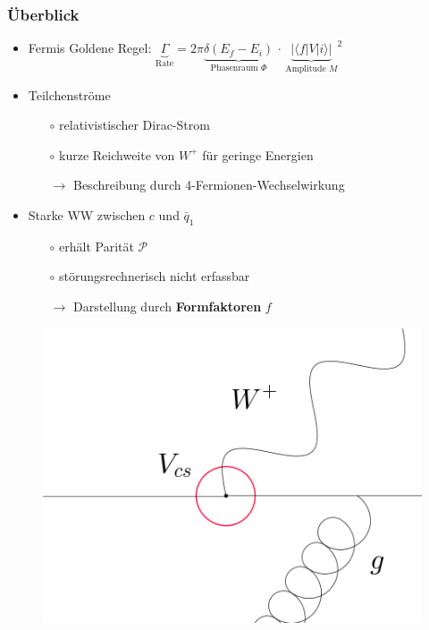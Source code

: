 \documentclass[hyperref={pdfpagelabels=false}]{beamer}
\begin{document}
\begin{frame}
\frametitle{\"Uberblick}
 \begin{minipage}[h]{0.62\textwidth}
 \begin{itemize}
  \item Fermis Goldene Regel: $\underbrace{\Gamma}_{\text{Rate}} = 2\pi \underbrace{\delta(E_f-E_i)}_{\text{Phasenraum }\Phi}\, \cdot \,{\underbrace{|\langle f|V|i\rangle|}_{\text{Amplitude }M}}^2$
  \item Teilchenstr\"ome
  \begin{itemize}
   \item [$\circ$] relativistischer Dirac-Strom
   \item [$\circ$] kurze Reichweite von $W^+$ f\"ur geringe Energien
   \item [$\rightarrow$] Beschreibung durch 4-Fermionen-Wechselwirkung
  \end{itemize}

  \item Starke WW zwischen $c$ und $\bar q_1$
  \begin{itemize}
   \item[$\circ$] erh\"alt Parit\"at $\mathcal{P}$
   \item[$\circ$] st\"orungsrechnerisch nicht erfassbar
   \item[$\rightarrow$] Darstellung durch \textbf{Formfaktoren} $f$
  \end{itemize}
 \end{itemize}
\end{minipage}
\begin{minipage}[h]{0.34\textwidth}
  \begin{figure}[h]
  \includegraphics[width = 1.3\textwidth]{../Abbildungen/DFeynSpez.png}
 \end{figure}
\end{minipage}
\end{frame}
\end{document}
